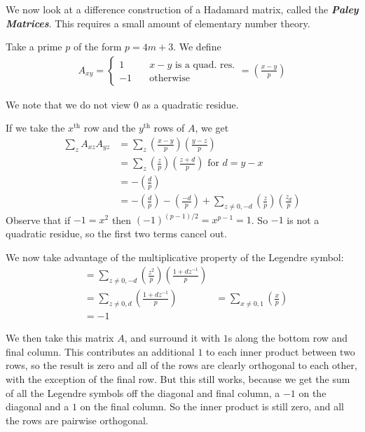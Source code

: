 \documentclass[]{article}
\theoremstyle{custhm}
\theoremstyle{cusdef}
\theoremstyle{custhm}
\theoremstyle{custhm}
\theoremstyle{custhm}
\theoremstyle{custhm}
\theoremstyle{cusdef}
\theoremstyle{remark}
\theoremstyle{custhm}
\newcommand{\undf}[1]{\textit{\textbf{#1}}}
\begin{document}
We now look at a difference construction of a Hadamard matrix, called the \undf{Paley Matrices}. This requires a small amount of elementary number theory.

Take a prime $p$ of the form $p = 4m+3$. We define
\begin{align*}
	A_{xy} = \left\lbrace \begin{array}{cc} 1&\quad x - y \textrm{ is a quad. res.}\\ -1&\quad \textrm{otherwise}\end{array}  \right. = \left(\frac{x-y}{p}\right)
\end{align*}

We note that we do not view $0$ as a quadratic residue.

If we take the $x^{\textrm{th}}$ row and the $y^{\textrm{th}}$ rows of $A$, we get
\begin{align*}
	\sum_{z}A_{xz}A_{yz} &= \sum_{z} \left(\frac{x-y}{p}\right)\left(\frac{y-z}{p}\right)\\
	&= \sum_{z}\left(\frac{z}{p}\right)\left(\frac{z+d}{p}\right)\textrm{ for }d = y-x\\
	&= -\left(\frac{d}{p}\right)\\
	&= -\left(\frac{d}{p}\right) - \left(\frac{-d}{p}\right) + \sum_{z\ne 0,-d}\left(\frac{z}{p}\right)\left(\frac{z_d}{p}\right)
\end{align*}
Observe that if $-1 = x^2$ then $(-1)^{(p-1)/2} = x^{p-1} = 1$. So $-1$ is not a quadratic residue, so the first two terms cancel out.

We now take advantage of the multiplicative property of the Legendre symbol:
\begin{align*}
	&= \sum_{z\ne 0,-d} \left(\frac{z^2}{p}\right)\left(\frac{1+dz^{-1}}{p}\right)\\
	&= \sum_{z\ne 0,d}\left(\frac{1+dz^{-1}}{p}\right)
	&= \sum_{x\ne 0,1}\left(\frac{x}{p}\right)\\
	&= -1
\end{align*}

We then take this matrix $A$, and surround it with $1$s along the bottom row and final column. This contributes an additional $1$ to each inner product between two rows, so the result is zero and all of the rows are clearly orthogonal to each other, with the exception of the final row. But this still works, because we get the sum of all the Legendre symbols off the diagonal and final column, a $-1$ on the diagonal and a $1$ on the final column. So the inner product is still zero, and all the rows are pairwise orthogonal.
\end{document}
